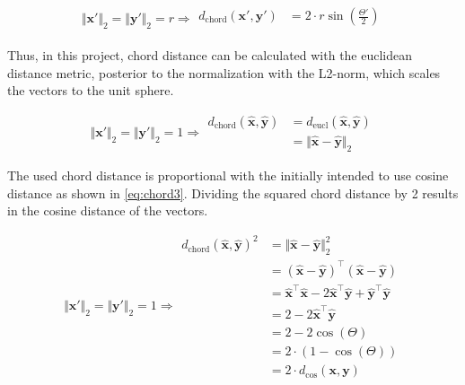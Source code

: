 \begin{equation}\label{eq:chord1}
    \Vert\mathbf{x}'\Vert_2 = \Vert\mathbf{y}'\Vert_2 = r \Rightarrow 
    \begin{aligned}
        d_{\text{chord}}(\mathbf{x}',\mathbf{y}') &= 2 \cdot r \sin \left(\frac{\Theta'}{2}\right)\\
    \end{aligned}
\end{equation}

Thus, in this project, chord distance can be calculated with the euclidean distance metric, posterior to the normalization with the L2-norm, which scales the vectors to the unit sphere.

\begin{equation}\label{eq:chord2}
    \Vert\mathbf{x}'\Vert_2 = \Vert\mathbf{y}'\Vert_2 = 1 \Rightarrow 
    \begin{aligned}
        d_{\text{chord}}(\mathbf{\hat{x}},\mathbf{\hat{y}}) &= d_{\text{eucl}}(\mathbf{\hat{x}},\mathbf{\hat{y}})\\
        &= \Vert\mathbf{\hat{x}} - \mathbf{\hat{y}}\Vert_2
    \end{aligned}
\end{equation}

The used chord distance is proportional with the initially intended to use cosine distance as shown in \autoref{eq:chord3}. Dividing the squared chord distance by 2 results in the cosine distance of the vectors.

\begin{equation}\label{eq:chord3}
    \Vert\mathbf{x}'\Vert_2 = \Vert\mathbf{y}'\Vert_2 = 1 \Rightarrow 
    \begin{aligned}  
        d_{\text{chord}}(\mathbf{\hat{x}},\mathbf{\hat{y}})^2 &= \Vert\mathbf{\hat{x}} - \mathbf{\hat{y}}\Vert_2^2\\
        &= (\mathbf{\hat{x}} - \mathbf{\hat{y}})^\top (\mathbf{\hat{x}} - \mathbf{\hat{y}})\\
        &= \mathbf{\hat{x}}^\top \mathbf{\hat{x}} - 2 \mathbf{\hat{x}}^\top \mathbf{\hat{y}} + \mathbf{\hat{y}}^\top \mathbf{\hat{y}}\\
        &= 2 - 2\mathbf{\hat{x}}^\top \mathbf{\hat{y}}\\
        &= 2 - 2 \cos(\Theta)\\
        &= 2 \cdot (1 - \cos(\Theta))\\
        &= 2 \cdot d_{\text{cos}}(\mathbf{x},\mathbf{y})
    \end{aligned}
\end{equation}

